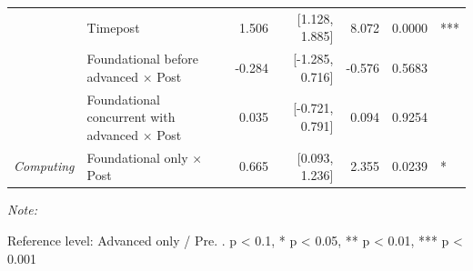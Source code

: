 \begin{table}[!h]
\begin{threeparttable}
\begin{tabular}[t]{>{}llrrrrl}
 & Timepost & 1.506 & {}[1.128, 1.885] & 8.072 & 0.0000 & ***\\

 & Foundational before advanced $\times$ Post & -0.284 & {}[-1.285, 0.716] & -0.576 & 0.5683 & \\

 & Foundational concurrent with advanced $\times$ Post & 0.035 & {}[-0.721, 0.791] & 0.094 & 0.9254 & \\

\multirow[t]{-7}{*}[\normalbaselineskip]{\raggedright\arraybackslash \em{Computing}} & Foundational only $\times$ Post & 0.665 & {}[0.093, 1.236] & 2.355 & 0.0239 & *\\
\bottomrule
\end{tabular}
\begin{tablenotes}[para]
\item \textit{Note: } 
\item Reference level: Advanced only / Pre. . p < 0.1, * p < 0.05, ** p < 0.01, *** p < 0.001
\end{tablenotes}
\end{threeparttable}
\end{table}
